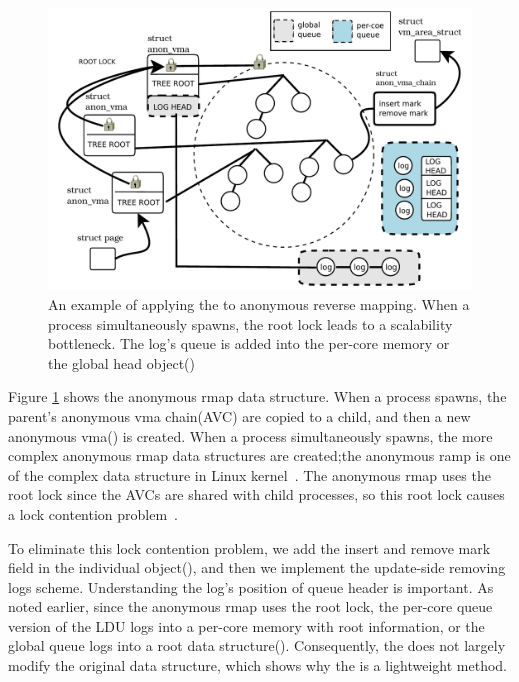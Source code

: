 \begin{figure}[tb]
  \begin{center}
     \includegraphics[width=1\textwidth,height=1\textheight,keepaspectratio]{fig/anon_vma}
  \end{center}
  \caption{An example of applying the \LDU to anonymous reverse mapping.
  When a process simultaneously spawns, the root lock leads to a scalability bottleneck. 
  The log's queue is added into the per-core memory or the
  global head object()}
  \label{fig:anonvmaramp}
\end{figure}

Figure \ref{fig:anonvmaramp} shows the anonymous rmap data structure.
When a process spawns, the parent's anonymous vma chain(AVC) are copied
to a child, and then a new anonymous vma() is created.
When a process simultaneously spawns, the more complex
anonymous rmap data structures are created;the anonymous ramp is one of the complex data
structure in Linux kernel~\cite{CorbetLWNANON}.
The anonymous rmap uses the root lock since the AVCs are shared with child processes, so this root lock causes a lock contention problem~\cite{Andi2011adding}.

To eliminate this lock contention problem, we add the insert and
remove mark field in the individual object(),
and then we implement the update-side removing logs scheme.
Understanding the log's position of queue header is important.
As noted earlier, since the anonymous rmap uses the root lock, the per-core queue version of
the LDU logs into a per-core memory with root information, or the global
queue logs into a root data structure().
Consequently, the \LDU does not largely modify the original data
structure, which shows why the \LDU is a lightweight method.

